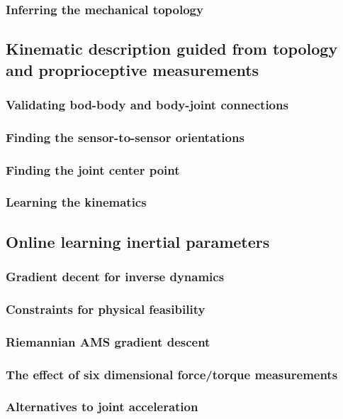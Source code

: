 \documentclass{article}
\begin{document}
\subsubsection{Inferring the mechanical topology}
\subsection{Kinematic description guided from topology and proprioceptive measurements}
\subsubsection{Validating bod-body and body-joint connections}
\subsubsection{Finding the sensor-to-sensor orientations}
\subsubsection{Finding the joint center point}
\subsubsection{Learning the kinematics}
\subsection{Online learning inertial parameters}
\subsubsection{Gradient decent for inverse dynamics}
\subsubsection{Constraints for physical feasibility}
\subsubsection{Riemannian AMS gradient descent}
\subsubsection{The effect of six dimensional force/torque measurements}
\subsubsection{Alternatives to joint acceleration}
\end{document}
